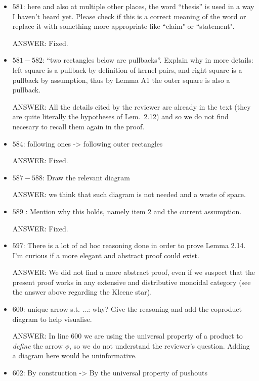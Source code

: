\documentclass[english,11pt,a4paper]{article}
\begin{document}
\begin{itemize}
\item $581$: here and also at multiple other places, the word ``thesis'' is used in a way I haven't heard yet. Please check if this is a correct meaning of the word or replace it with something more appropriate like ``claim" or ``statement".

ANSWER: Fixed. 

\item $581-582$: ``two rectangles below are pullbacks''. Explain why in more details: left square is a pullback by definition of kernel pairs, and right square is a pullback by assumption, thus by Lemma A1 the outer square is also a pullback.

ANSWER: All the details cited by the reviewer are already in the text (they are quite literally the hypotheses of Lem.~2.12) and so we do not find necesary to recall them again in the proof.

\item $584$: following ones -> following outer rectangles

ANSWER: Fixed.

\item $587-588$: Draw the relevant diagram

{\color{red} ANSWER: we think that such diagram is not needed and a waste of space.}

\item $589$ : Mention why this holds, namely item 2 and the current assumption.

ANSWER: Fixed.

\item $597$: There is a lot of ad hoc reasoning done in order to prove Lemma 2.14. I'm curious if a more elegant and abstract proof could exist.

ANSWER: We did not find a more abstract proof, even if we suspect that the present proof works in any extensive and distributive monoidal category (see the answer above regarding the Kleene star).

\item $600$: unique arrow s.t. ...: why? Give the reasoning and add the coproduct diagram to help visualise.

ANSWER: In line $600$ we are using the universal property of a product to \emph{define} the arrow $\phi$, so we do not understand the reviewer's question. Adding a diagram here would be uninformative.


\item $602$: By construction -> By the universal property of pushouts


\end{itemize}
\end{document}
